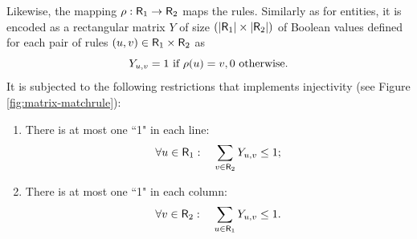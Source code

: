 \documentclass[a4paper,twoside]{article}
\begin{document}
Likewise, the mapping $\rho: \mathsf{R}_1 \to \mathsf{R}_2$ maps the rules. Similarly as for entities, it is encoded as a rectangular matrix $Y$ of size $(|\mathsf{R}_1| \times |\mathsf{R}_2|)$ of Boolean values defined for each pair of rules $(u,v)\in \mathsf{R}_1 \times \mathsf{R}_2$  as
$$Y_{u,v} =1 \text{ if } \rho(u)=v, 0 \text{ otherwise.}$$
It is subjected to the following restrictions that implements injectivity (see Figure \ref{fig:matrix-matchrule}):
\begin{enumerate}
\item There is at most one ``1" in  each line:~
$$
 \forall u \in \mathsf{R}_1: \quad
   \sum_{v \in \mathsf{R}_2} Y_{u,v} \leq 1;
  $$
  
 \item There is at most one ``1" in  each column: ~ 
$$
  \forall v \in \mathsf{R}_2: \quad
  \sum_{u \in \mathsf{R}_1} Y_{u,v} \leq 1. 
  $$
\end{enumerate}

\end{document}
